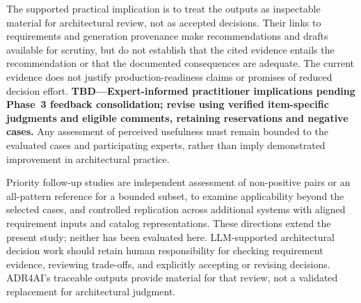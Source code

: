 The supported practical implication is to treat the outputs as inspectable
material for architectural review, not as accepted decisions. Their links to
requirements and generation provenance make recommendations and drafts
available for scrutiny, but do not establish that the cited evidence entails
the recommendation or that the documented consequences are adequate.
The current evidence does not justify production-readiness claims or promises
of reduced decision effort.
\textbf{TBD---Expert-informed practitioner implications pending Phase~3
feedback consolidation; revise using verified item-specific judgments and
eligible comments, retaining reservations and negative cases.}
Any assessment of perceived usefulness must remain bounded to the evaluated
cases and participating experts, rather than imply demonstrated improvement
in architectural practice.

Priority follow-up studies are independent assessment of non-positive pairs
or an all-pattern reference for a bounded subset, to examine applicability
beyond the selected cases, and controlled replication across additional
systems with aligned requirement inputs and catalog representations.
These directions extend the present study; neither has been evaluated here.
LLM-supported architectural decision work should retain human responsibility
for checking requirement evidence, reviewing trade-offs, and explicitly
accepting or revising decisions. ADR4AI's traceable outputs provide material
for that review, not a validated replacement for architectural judgment.

